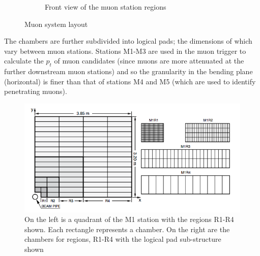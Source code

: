 \begin{figure}[htbp]
\begin{center}
\begin{subfigure}[b]{0.45\textwidth}
			\caption{Front view of the muon station regions}
			\label{default}
		\end{subfigure}
	\end{center}
	\caption{Muon system layout}
	\label{fig: muon system layout}
\end{figure}


The chambers are further subdivided into logical pads; the dimensions of which vary between muon stations. Stations M1-M3 are used in the muon trigger to calculate the $p_t$ of muon candidates (since muons are more attenuated at the further downstream muon stations) and so the granularity in the bending plane (horizontal) is finer than that of stations M4 and M5 (which are used to identify penetrating muons).

\begin{figure}[htbp]
	\begin{center}
			\includegraphics[width=\textwidth]{./Chapters/detector/muon_system/logical_pad_layout.png}
		\caption{On the left is a quadrant of the M1 station with the regions R1-R4 shown. Each rectangle represents a chamber. On the right are the chambers for regions, R1-R4 with the logical pad sub-structure shown}
		\label{fig: muon region granularity}
	\end{center}
\end{figure}

